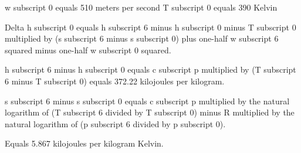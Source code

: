 w subscript 0 equals 510 meters per second  
T subscript 0 equals 390 Kelvin  

Delta h subscript 0 equals h subscript 6 minus h subscript 0 minus T subscript 0 multiplied by (s subscript 6 minus s subscript 0) plus one-half w subscript 6 squared minus one-half w subscript 0 squared.  

h subscript 6 minus h subscript 0 equals c subscript p multiplied by (T subscript 6 minus T subscript 0) equals 372.22 kilojoules per kilogram.  

s subscript 6 minus s subscript 0 equals c subscript p multiplied by the natural logarithm of (T subscript 6 divided by T subscript 0) minus R multiplied by the natural logarithm of (p subscript 6 divided by p subscript 0).  

Equals 5.867 kilojoules per kilogram Kelvin.